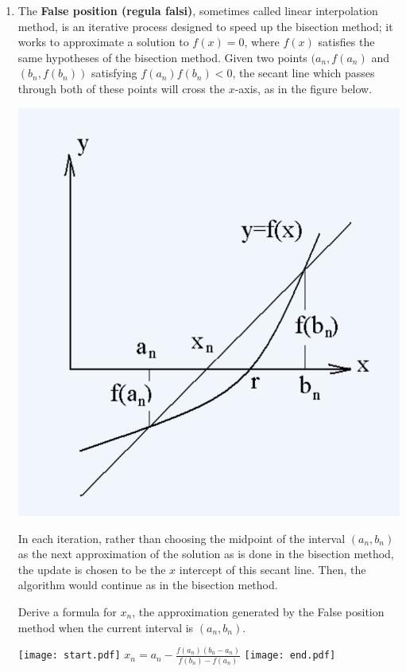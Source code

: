 \documentclass[12pt]{article}
\begin{document}
\begin{enumerate}
\item The  {\bf False position (regula falsi)}, sometimes called linear interpolation method, is an iterative process designed to speed up the bisection method; it works to approximate a solution to $f(x)=0$, where $f(x)$ satisfies the same hypotheses of the bisection method.  Given two points $(a_n,f(a_n)$ and $(b_n,f(b_n))$ satisfying $f(a_n)f(b_n)<0$, the secant line which passes through both of these points will cross the $x$-axis, as in the figure below.
\begin{center}
\includegraphics[scale=0.5]{LinearInterp.png}
\end{center}
In each iteration, rather than choosing the midpoint of the interval $(a_n,b_n)$ as the next approximation of the solution as is done in the bisection method, the update is chosen to be the $x$ intercept of this secant line.  Then, the algorithm would continue as in the bisection method.

Derive a formula for $x_n$, the approximation generated by the False position method when the current interval is $(a_n,b_n)$.

\texttt{[image: start.pdf]}
{{$x_{n} = a_n - \frac{f(a_n)(b_n-a_n)}{f(b_n)-f(a_n)}$}}
\texttt{[image: end.pdf]}


\end{enumerate}
\end{document}
